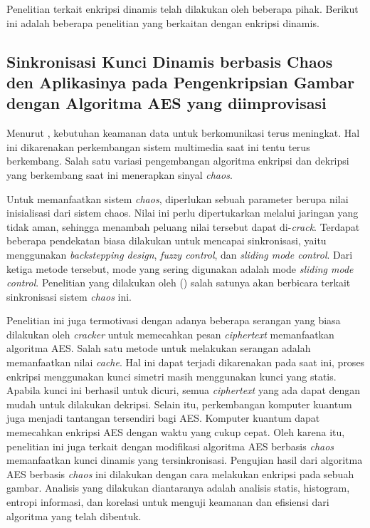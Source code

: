 Penelitian terkait enkripsi dinamis telah dilakukan oleh beberapa pihak. Berikut ini adalah beberapa penelitian yang berkaitan dengan enkripsi dinamis. 

\subsection{Sinkronisasi Kunci Dinamis berbasis Chaos den Aplikasinya pada Pengenkripsian Gambar dengan Algoritma AES yang diimprovisasi}

Menurut \textcite{lin2021}, kebutuhan keamanan data untuk berkomunikasi terus meningkat. Hal ini dikarenakan perkembangan sistem multimedia saat ini tentu terus berkembang. Salah satu variasi pengembangan algoritma enkripsi dan dekripsi yang berkembang saat ini menerapkan sinyal \emph{chaos}. 

Untuk memanfaatkan sistem \emph{chaos}, diperlukan sebuah parameter berupa nilai inisialisasi dari sistem chaos. Nilai ini perlu dipertukarkan melalui jaringan yang tidak aman, sehingga menambah peluang nilai tersebut dapat di-\emph{crack}. Terdapat beberapa pendekatan biasa dilakukan untuk mencapai sinkronisasi, yaitu menggunakan \emph{backstepping design}, \emph{fuzzy control}, dan \emph{sliding mode control}. Dari ketiga metode tersebut, mode yang sering digunakan adalah mode \emph{sliding mode control}. Penelitian yang dilakukan oleh (\cite{lin2021}) salah satunya akan berbicara terkait sinkronisasi sistem \emph{chaos} ini.

Penelitian ini juga termotivasi dengan adanya beberapa serangan yang biasa dilakukan oleh \emph{cracker} untuk memecahkan pesan \emph{ciphertext} memanfaatkan algoritma AES. Salah satu metode untuk melakukan serangan adalah memanfaatkan nilai \emph{cache}. Hal ini dapat terjadi dikarenakan pada saat ini, proses enkripsi menggunakan kunci simetri masih menggunakan kunci yang statis. Apabila kunci ini berhasil untuk dicuri, semua \emph{ciphertext} yang ada dapat dengan mudah untuk dilakukan dekripsi. Selain itu, perkembangan komputer kuantum juga menjadi tantangan tersendiri bagi AES. Komputer kuantum dapat memecahkan enkripsi AES dengan waktu yang cukup cepat. Oleh karena itu, penelitian ini juga terkait dengan modifikasi algoritma AES berbasis \emph{chaos} memanfaatkan kunci dinamis yang tersinkronisasi. Pengujian hasil dari algoritma AES berbasis \emph{chaos} ini dilakukan dengan cara melakukan enkripsi pada sebuah gambar. Analisis yang dilakukan diantaranya adalah analisis statis, histogram, entropi informasi, dan korelasi untuk menguji keamanan dan efisiensi dari algoritma yang telah dibentuk.

